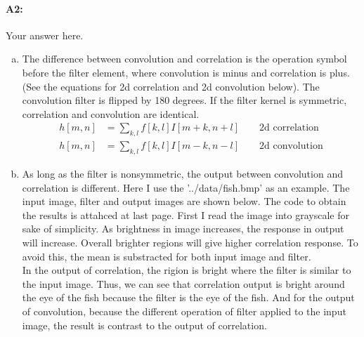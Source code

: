 \paragraph{A2:} Your answer here.

\begin{enumerate}[(a)]

\item The difference between convolution and correlation is the operation symbol before the filter element, where convolution is minus and correlation is plus. (See the equations for 2d correlation and 2d convolution below). The convolution filter is flipped by 180 degrees. If the filter kernel is symmetric, correlation and convolution are identical.
\begin{equation*}
    \begin{split}
        h[m, n] &= \sum_{k,l}f[k,l]I[m+k, n+l] \qquad \text{2d correlation} \\
        h[m, n] &= \sum_{k,l}f[k,l]I[m-k, n-l] \qquad \text{2d convolution}
    \end{split}
\end{equation*}

\item As long as the filter is nonsymmetric, the output between convolution and correlation is different. Here I use the '../data/fish.bmp' as an example. The input image, filter and output images are shown  below. The code to obtain the results is attahced at last page. First I read the image into grayscale for sake of simplicity. As brightness in image increases, the response in output will increase. Overall brighter regions will give higher correlation response. To avoid this, the mean is substracted for both input image and filter. \\
In the output of correlation, the rigion is bright where the filter is similar to the input image. Thus, we can see that correlation output is bright around the eye of the fish because the filter is the eye of the fish. And for the output of convolution, because the different operation of filter applied to the input image, the result is contrast to the output of correlation.


\end{enumerate}
